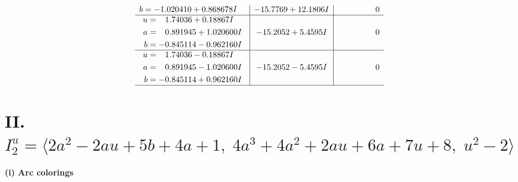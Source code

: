 \documentclass[1p]{elsarticle_modified}
\theoremstyle{definition}
\begin{document}
$$\begin{array}{c|c|c}
\begin{aligned}
b &= -1.020410 + 0.868678 I\end{aligned}
 & -15.7769 + 12.1806 I & \phantom{-0.000000 } 0 \\ \hline\begin{aligned}
u &= \phantom{-}1.74036 + 0.18867 I \\
a &= \phantom{-}0.891945 + 1.020600 I \\
b &= -0.845114 - 0.962160 I\end{aligned}
 & -15.2052 + 5.4595 I & \phantom{-0.000000 } 0 \\ \hline\begin{aligned}
u &= \phantom{-}1.74036 - 0.18867 I \\
a &= \phantom{-}0.891945 - 1.020600 I \\
b &= -0.845114 + 0.962160 I\end{aligned}
 & -15.2052 - 5.4595 I & \phantom{-0.000000 } 0\\
 \hline 
 \end{array}$$\newpage\newpage\renewcommand{\arraystretch}{1}
\centering \section*{II. $I^u_{2}= \langle 2 a^2-2 a u+5 b+4 a+1,\;4 a^3+4 a^2+2 a u+6 a+7 u+8,\;u^2-2 \rangle$}
\flushleft \textbf{(i) Arc colorings}\\
\end{document}
